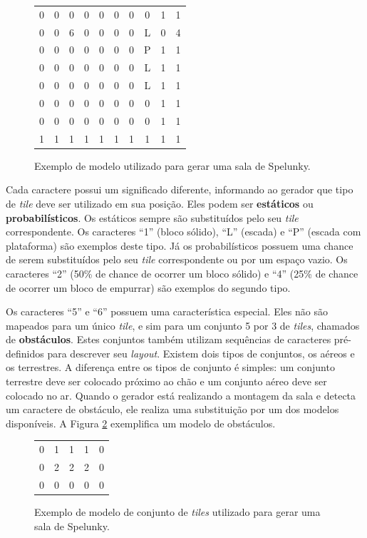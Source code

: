 \begin{figure}[htb!]
\centering
\begin{tabular}{c c c c c c c c c c}
    0 & 0 & 0 & 0 & 0 & 0 & 0 & 0 & 1 & 1 \\
    0 & 0 & 6 & 0 & 0 & 0 & 0 & L & 0 & 4 \\
    0 & 0 & 0 & 0 & 0 & 0 & 0 & P & 1 & 1 \\
    0 & 0 & 0 & 0 & 0 & 0 & 0 & L & 1 & 1 \\
    0 & 0 & 0 & 0 & 0 & 0 & 0 & L & 1 & 1 \\
    0 & 0 & 0 & 0 & 0 & 0 & 0 & 0 & 1 & 1 \\
    0 & 0 & 0 & 0 & 0 & 0 & 0 & 0 & 1 & 1 \\
    1 & 1 & 1 & 1 & 1 & 1 & 1 & 1 & 1 & 1 \\
\end{tabular}
\caption{\label{fig:spelunky-procgen-room-template}Exemplo de modelo utilizado
para gerar uma sala de Spelunky.}
\end{figure}

Cada caractere possui um significado diferente, informando ao gerador que tipo
de \textit{tile} deve ser utilizado em sua posição. Eles podem ser
\textbf{estáticos} ou \textbf{probabilísticos}. Os estáticos sempre são
substituídos pelo seu \textit{tile} correspondente. Os caracteres ``1'' (bloco
sólido), ``L'' (escada) e ``P'' (escada com plataforma) são exemplos deste
tipo. Já os probabilísticos possuem uma chance de serem substituídos pelo seu
\textit{tile} correspondente ou por um espaço vazio. Os caracteres ``2'' (50\%
de chance de ocorrer um bloco sólido) e ``4'' (25\% de chance de ocorrer um
bloco de empurrar) são exemplos do segundo tipo.

Os caracteres ``5'' e ``6'' possuem uma característica especial. Eles não são
mapeados para um único \textit{tile}, e sim para um conjunto 5 por 3 de
\textit{tiles}, chamados de \textbf{obstáculos}. Estes conjuntos também utilizam
sequências de caracteres pré-definidos para descrever seu \textit{layout}.
Existem dois tipos de conjuntos, os aéreos e os terrestres. A diferença entre os
tipos de conjunto é simples: um conjunto terrestre deve ser colocado próximo ao
chão e um conjunto aéreo deve ser colocado no ar. Quando o gerador está
realizando a montagem da sala e detecta um caractere de obstáculo, ele realiza
uma substituição por um dos modelos disponíveis. A Figura
\ref{fig:spelunky-procgen-room-chunk} exemplifica um modelo de obstáculos.

\begin{figure}[htb!]
\centering
\begin{tabular}{c c c c c}
    0 & 1 & 1 & 1 & 0 \\
    0 & 2 & 2 & 2 & 0 \\
    0 & 0 & 0 & 0 & 0
\end{tabular}
\caption{\label{fig:spelunky-procgen-room-chunk}Exemplo de modelo de conjunto de
\textit{tiles} utilizado para gerar uma sala de Spelunky.}
\end{figure}

